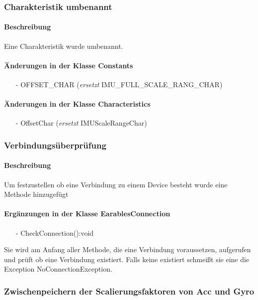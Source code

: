 \documentclass[a4paper,12pt]{article}
\begin{document}
\subsubsection{Charakteristik umbenannt}
\paragraph{Beschreibung}
Eine Charakteristik wurde umbenannt.
\paragraph{Änderungen in der Klasse Constants}
\begin{itemize}
	\item[-] OFFSET\_CHAR (\textit{ersetzt}  IMU\_FULL\_SCALE\_RANG\_CHAR) %
\end{itemize}
\paragraph{Änderungen in der Klasse Characteristics}
\begin{itemize}
	\item[-] OffsetChar (\textit{ersetzt} IMUScaleRangeChar) %
\end{itemize}

\subsubsection{Verbindungsüberprüfung}
\paragraph{Beschreibung}
Um festzustellen ob eine Verbindung zu einem Device besteht wurde eine Methode hinzugefügt
\paragraph{Ergänzungen in der Klasse EarablesConnection}
\begin{itemize}
	\item[-]  CheckConnection():void  
\end{itemize}
Sie wird am Anfang aller  Methode, die eine Verbindung voraussetzen, aufgerufen und prüft ob eine Verbindung existiert. Falls keine existiert schmeißt sie eine die Exception NoConnectionException.

\subsubsection{Zwischenpeichern der Scalierungsfaktoren von Acc und Gyro}
\end{document}
